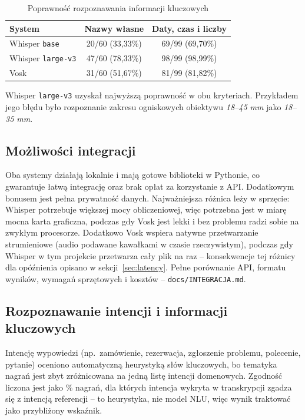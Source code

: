 \documentclass{article}
\begin{document}
\begin{table}[htbp]
\centering
\caption{Poprawność rozpoznawania informacji kluczowych}
\label{tab:informacje-kluczowe}
\begin{tabular}{lcc}
\toprule
\textbf{System} & \textbf{Nazwy własne} &
\textbf{Daty, czas i liczby} \\
\midrule
Whisper \texttt{base}     & 20/60 (33,33\%) & 69/99 (69,70\%) \\
Whisper \texttt{large-v3} & 47/60 (78,33\%) & 98/99 (98,99\%) \\
Vosk                     & 31/60 (51,67\%) & 81/99 (81,82\%) \\
\bottomrule
\end{tabular}
\end{table}

Whisper \texttt{large-v3} uzyskał najwyższą poprawność w obu
kryteriach. Przykładem jego błędu było rozpoznanie zakresu
ogniskowych obiektywu \emph{18--45 mm} jako \emph{18--35 mm}.

\subsection{Możliwości integracji}
Oba systemy działają lokalnie i mają gotowe biblioteki w Pythonie, co gwarantuje łatwą integrację oraz brak opłat za korzystanie z API. Dodatkowym bonusem jest pełna prywatność danych. Najważniejsza różnica leży w sprzęcie: Whisper potrzebuje większej mocy obliczeniowej, więc potrzebna jest w miarę mocna karta graficzna, podczas gdy Vosk jest lekki i bez problemu radzi sobie na zwykłym procesorze. Dodatkowo Vosk wspiera natywne przetwarzanie strumieniowe (audio podawane kawałkami w czasie rzeczywistym), podczas gdy Whisper w tym projekcie przetwarza cały plik na raz -- konsekwencje tej różnicy dla opóźnienia opisano w sekcji~\ref{sec:latency}. Pełne porównanie API, formatu wyników, wymagań sprzętowych i kosztów -- \texttt{docs/INTEGRACJA.md}.

\subsection{Rozpoznawanie intencji i informacji kluczowych}

Intencję wypowiedzi (np.\ zamówienie, rezerwacja, zgłoszenie problemu,
polecenie, pytanie) oceniono automatyczną heurystyką słów kluczowych, bo
tematyka nagrań jest zbyt zróżnicowana na jedną listę intencji domenowych.
Zgodność liczona jest jako \% nagrań, dla których intencja wykryta w
transkrypcji zgadza się z intencją referencji -- to heurystyka, nie model
NLU, więc wynik traktować jako przybliżony wskaźnik.
\end{document}
